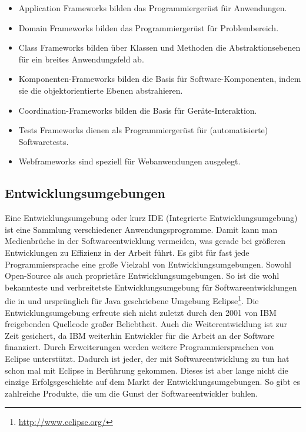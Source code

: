 \newpage
{}
\begin{itemize}
  \item Application Frameworks 
        \newline bilden das Programmiergerüst für Anwendungen.
  \item Domain Frameworks 
        \newline bilden das Programmiergerüst für Problembereich.
  \item Class Frameworks 
        \newline bilden über Klassen und Methoden die Abstraktionsebenen 
        für ein breites Anwendungsfeld ab.
  \item Komponenten-Frameworks
        \newline bilden die Basis für Software-Komponenten, indem sie die 
        objektorientierte Ebenen abstrahieren.
  \item Coordination-Frameworks
        \newline bilden die Basis für Geräte-Interaktion.
  \item Tests Frameworks
        \newline dienen als Programmiergerüst für (automatisierte) Softwaretests.
  \item Webframeworks
        \newline sind speziell für Webanwendungen ausgelegt.
\end{itemize}

\subsection{Entwicklungsumgebungen}
Eine Entwicklungsumgebung oder kurz IDE (Integrierte Entwicklungsumgebung)
ist eine Sammlung verschiedener Anwendungsprogramme. Damit kann man 
Medienbrüche in der Softwareentwicklung vermeiden, was gerade bei größeren
Entwicklungen zu Effizienz in der Arbeit führt.
Es gibt für fast jede Programmiersprache eine große Vielzahl von 
Entwicklungsumgebungen. Sowohl Open-Source als auch proprietäre 
Entwicklungsumgebungen.
So ist die wohl bekannteste und verbreitetste Entwicklungsumgebung für
Softwareentwicklungen die in und ursprünglich für Java geschriebene 
Umgebung Eclipse\footnote{\url{http://www.eclipse.org/}}. Die Entwicklungsumgebung
erfreute sich nicht zuletzt durch den 2001 von IBM freigebenden Quellcode
großer Beliebtheit. Auch die Weiterentwicklung ist zur Zeit gesichert, 
da IBM weiterhin Entwickler für die Arbeit an der Software finanziert. 
Durch Erweiterungen werden weitere Programmiersprachen
von Eclipse unterstützt. Dadurch ist jeder, der mit Softwareentwicklung
zu tun hat schon mal mit Eclipse in Berührung gekommen.  
Dieses ist aber lange nicht die einzige Erfolgsgeschichte auf dem Markt
der Entwicklungsumgebungen. So gibt es zahlreiche Produkte, die um die 
Gunst der Softwareentwickler buhlen. 

